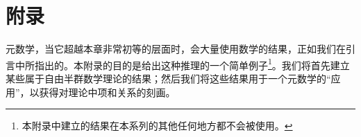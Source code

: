 \section*{附录}
{}
\setcounter{subsection}{0}


元数学，当它超越本章非常初等的层面时，会大量使用数学的结果，正如我们在引言中所指出的。本附录的目的是给出这种推理的一个简单例子\footnote{本附录中建立的结果在本系列的其他任何地方都不会被使用。}。我们将首先建立某些属于自由半群数学理论的结果；然后我们将这些结果用于一个元数学的“应用”，以获得对理论中项和关系的刻画。

